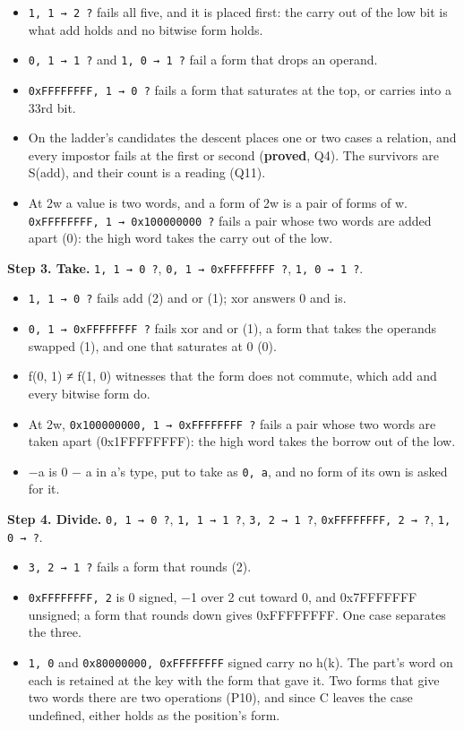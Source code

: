 \begin{itemize}
\item \texttt{1, 1 → 2 ?} fails all five, and it is placed first: the carry out of the low bit is what add holds and no bitwise form holds.
\item \texttt{0, 1 → 1 ?} and \texttt{1, 0 → 1 ?} fail a form that drops an operand.
\item \texttt{0x\allowbreak{}FFFFFFFF, 1 → 0 ?} fails a form that saturates at the top, or carries into a 33rd bit.
\item On the ladder's candidates the descent places one or two cases a relation, and every impostor fails at the first or second (\textbf{proved}, Q4). The survivors are S(add), and their count is a reading (Q11).
\item At 2w a value is two words, and a form of 2w is a pair of forms of w. \texttt{0x\allowbreak{}FFFFFFFF, 1 → 0x100000000 ?} fails a pair whose two words are added apart (0): the high word takes the carry out of the low.
\end{itemize}

\textbf{Step 3. Take.} \texttt{1, 1 → 0 ?}, \texttt{0, 1 → 0x\allowbreak{}FFFFFFFF ?}, \texttt{1, 0 → 1 ?}.

\begin{itemize}
\item \texttt{1, 1 → 0 ?} fails add (2) and or (1); xor answers 0 and is.
\item \texttt{0, 1 → 0x\allowbreak{}FFFFFFFF ?} fails xor and or (1), a form that takes the operands swapped (1), and one that saturates at 0 (0).
\item f(0, 1) ≠ f(1, 0) witnesses that the form does not commute, which add and every bitwise form do.
\item At 2w, \texttt{0x100000000, 1 → 0x\allowbreak{}FFFFFFFF ?} fails a pair whose two words are taken apart (0x1FFFFFFFF): the high word takes the borrow out of the low.
\item −a is 0 − a in a's type, put to take as \texttt{0, a}, and no form of its own is asked for it.
\end{itemize}

\textbf{Step 4. Divide.} \texttt{0, 1 → 0 ?}, \texttt{1, 1 → 1 ?}, \texttt{3, 2 → 1 ?}, \texttt{0x\allowbreak{}FFFFFFFF, 2 → ?}, \texttt{1, 0 → ?}.

\begin{itemize}
\item \texttt{3, 2 → 1 ?} fails a form that rounds (2).
\item \texttt{0x\allowbreak{}FFFFFFFF, 2} is 0 signed, −1 over 2 cut toward 0, and 0x7FFFFFFF unsigned; a form that rounds down gives 0xFFFFFFFF. One case separates the three.
\item \texttt{1, 0} and \texttt{0x80000000, 0x\allowbreak{}FFFFFFFF} signed carry no h(k). The part's word on each is retained at the key with the form that gave it. Two forms that give two words there are two operations (P10), and since C leaves the case undefined, either holds as the position's form.
\end{itemize}

